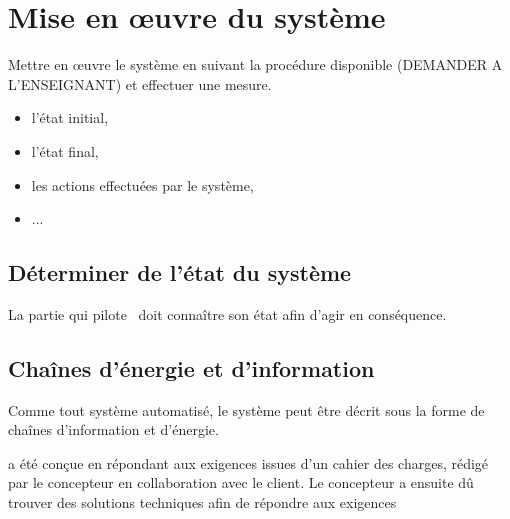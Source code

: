 \section{Mise en \oe uvre du système}


Mettre en \oe uvre le système en suivant la procédure disponible (DEMANDER A L'ENSEIGNANT) et effectuer une mesure.


\begin{itemize}
 \item l'état initial,
 \item l'état final,
 \item les actions effectuées par le système,
 \item ...
\end{itemize}

\subsection{Déterminer de l'état du système}

La partie qui pilote \lesysteme\ doit connaître son état afin d'agir en conséquence. 



\subsection{Chaînes d'énergie et d'information}

Comme tout système automatisé, le système peut être décrit sous la forme de chaînes d'information et d'énergie.


\lesysteme a été conçue en répondant aux exigences issues d'un cahier des charges, rédigé par le concepteur en collaboration avec le client. Le concepteur a ensuite dû trouver des solutions techniques afin de répondre aux exigences 

